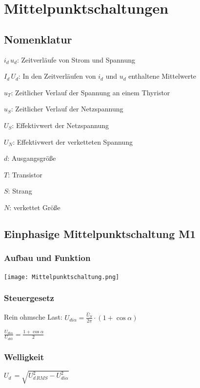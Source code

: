 \documentclass[german]{latex4ei/latex4ei_sheet}
\begin{document}
\section{Mittelpunktschaltungen}
	\begin{sectionbox}
		\subsection{Nomenklatur}
			\begin{bluebox}
				\item $i_d\,u_d$: Zeitverläufe von Strom und Spannung
				\item $I_d\,U_d$: In den Zeitverläufen von $i_d$ und $u_d$ enthaltene Mittelwerte
				\item $u_T$: Zeitlicher Verlauf der Spannung an einem Thyristor
				\item $u_S$: Zeitlicher Verlauf der Netzspannung
				\item $U_S$: Effektivwert der Netzspannung
				\item $U_N$: Effektivwert der verketteten Spannung
				\item $d$: Ausgangsgröße
				\item $T$: Transistor
				\item $S$: Strang
				\item $N$: verkettet Größe
			\end{bluebox}
		\subsection{Einphasige Mittelpunktschaltung M1}
			\subsubsection{Aufbau und Funktion}
				\texttt{[image: Mittelpunktschaltung.png]}
			\subsubsection{Steuergesetz}
				\begin{symbolbox}
					\item Rein ohmsche Last: $U_{di\alpha} = \frac{\hat{U}_S}{2\pi}\cdot (1+\cos  \alpha)$
					\item $\frac{U_{di\alpha}}{U_{di0}} = \frac{1+\cos \alpha}{2}$
				\end{symbolbox}
			\subsubsection{Welligkeit}
				\begin{bluebox}
					\item $U_{d~} = \sqrt{U^2_{d\,RMS}-U^2_{di\alpha}}$
				\end{bluebox}

\end{sectionbox}
\end{document}
